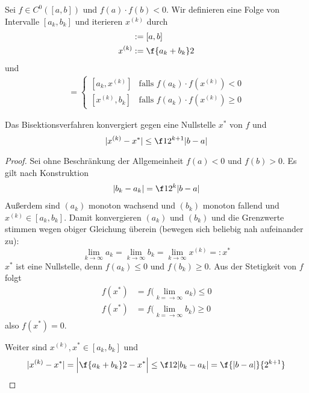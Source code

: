 \documentclass[11pt]{scrbook}
\begin{document}
\begin{df}[Bisektionsverfahren] \label{3.1}
	Sei $f \in C^0([a,b])$ und $f(a) \cdot f(b) < 0$.
	Wir definieren eine Folge von Intervalle $[a_k, b_k]$ und iterieren $x^{(k)}$ durch
	\begin{align*}
		[a_0, b_0] &:= [a,b] \\
		x^{(k)} &:= \f {a_k + b_k}2
	\end{align*}
	und
	\begin{align*}
		[a_{k+1}, b_{k+1}] = \begin{cases}
			[a_k, x^{(k)}] & \text{falls } f(a_k) \cdot f(x^{(k)}) < 0 \\
			[x^{(k)}, b_k] & \text{falls } f(a_k) \cdot f(x^{(k)}) \ge 0
		\end{cases}
	\end{align*}
\end{df}

\begin{st} \label{3.2}
	Das Bisektionsverfahren konvergiert gegen eine Nullstelle $x^*$ von $f$ und
	\[
		|x^{(k)} - x^*| \le \f 1{2^{k+1}} |b-a|
	\]
	\begin{proof}
		Sei ohne Beschränkung der Allgemeinheit $f(a) < 0$ und $f(b) > 0$.
		Es gilt nach Konstruktion
		\begin{align*}
			|b_k - a_k| &= \f 1{2^k} |b-a| \\
		\end{align*}
		Außerdem sind $(a_k)$ monoton wachsend und $(b_k)$ monoton fallend und $x^{(k)} \in [a_k,b_k]$.
		Damit konvergieren $(a_k)$ und $(b_k)$ und die Grenzwerte stimmen wegen obiger Gleichung überein (bewegen sich beliebig nah aufeinander zu):
		\[
			\lim_{k\to \infty} a_k = \lim_{k\to \infty} b_k = \lim_{k\to \infty} x^{(k)} =: x^*
		\]
		$x^*$ ist eine Nullstelle, denn $f(a_k) \le 0$ und $f(b_k) \ge 0$.
		Aus der Stetigkeit von $f$ folgt
		\begin{align*}
			f(x^*) &= f\big( \lim_{k=\to \infty}a_k \big) \le 0 \\
			f(x^*) &= f\big( \lim_{k=\to \infty}b_k \big) \ge 0
		\end{align*}
		also $f(x^*) = 0$.

		Weiter sind $x^{(k)}, x^* \in [a_k, b_k]$ und
		\begin{align*}
			|x^{(k)} - x^*| = \Big| \f {a_k + b_k}2 - x^* \Big| \le \f 12 |b_k-a_k| = \f {|b-a|}{2^{k+1}}
		\end{align*}
	\end{proof}
\end{st}
\end{document}
